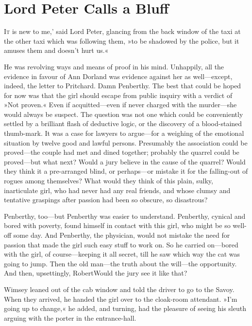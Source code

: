 \chapter{Lord Peter Calls a Bluff}

\lettrine[lines=4,ante=‘]{I}{t} is new to me,' said Lord Peter, glancing from the back window of the taxi at the other taxi which was following them, »to be shadowed by the police, but it amuses them and doesn't hurt us.«

\zz
He was revolving ways and means of proof in his mind. Unhappily, all the evidence in favour of Ann Dorland was evidence against her as well—except, indeed, the letter to Pritchard. Damn Penberthy. The best that could be hoped for now was that the girl should escape from public inquiry with a verdict of »Not proven.« Even if acquitted—even if never charged with the murder—she would always be suspect. The question was not one which could be conveniently settled by a brilliant flash of deductive logic, or the discovery of a blood-stained thumb-mark. It was a case for lawyers to argue—for a weighing of the emotional situation by twelve good and lawful persons. Presumably the association could be proved—the couple had met and dined together; probably the quarrel could be proved—but what next? Would a jury believe in the cause of the quarrel? Would they think it a pre-arranged blind, or perhaps—or mistake it for the falling-out of rogues among themselves? What would they think of this plain, sulky, inarticulate girl, who had never had any real friends, and whose clumsy and tentative graspings after passion had been so obscure, so disastrous?

Penberthy, too—but Penberthy was easier to understand. Penberthy, cynical and bored with poverty, found himself in contact with this girl, who might be so well-off some day. And Penberthy, the physician, would not mistake the need for passion that made the girl such easy stuff to work on. So he carried on—bored with the girl, of course—keeping it all secret, till he saw which way the cat was going to jump. Then the old man—the truth about the will—the opportunity. And then, upsettingly, Robert\textellipsis Would the jury see it like that?

Wimsey leaned out of the cab window and told the driver to go to the Savoy. When they arrived, he handed the girl over to the cloak-room attendant. »I'm going up to change,« he added, and turning, had the pleasure of seeing his sleuth arguing with the porter in the entrance-hall.


